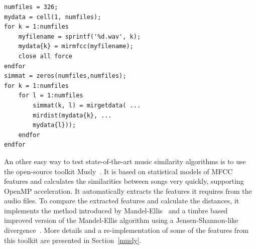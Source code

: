 \begin{lstlisting}[frame=single,label={lst:MIRmat},
caption={MATLAB code for estimating similarities based on MFCCs},captionpos=b]  % Start your code-block
numfiles = 326;
mydata = cell(1, numfiles);
for k = 1:numfiles
	myfilename = sprintf('%d.wav', k);
	mydata{k} = mirmfcc(myfilename);
	close all force
endfor
simmat = zeros(numfiles,numfiles);
for k = 1:numfiles
	for l = 1:numfiles
		simmat(k, l) = mirgetdata( ...
		mirdist(mydata{k}, ...
		mydata{l}));
	endfor
endfor
\end{lstlisting}
\FloatBarrier
\noindent An other easy way to test state-of-the-art music similarity algorithms is to use the open-source toolkit Musly~\cite{musly1}. It is based on statistical models of MFCC features and calculates the similarities between songs very quickly, supporting OpenMP acceleration. It automatically extracts the features it requires from the audio files. To compare the extracted features and calculate the distances, it implements the method introduced by Mandel-Ellis~\cite{mandelellis1} and a timbre based improved version of the Mandel-Ellis algorithm using a Jensen-Shannon-like divergence~\cite{musly2}. More details and a re-implementation of some of the features from this toolkit are presented in Section~\ref{musly}.\\

